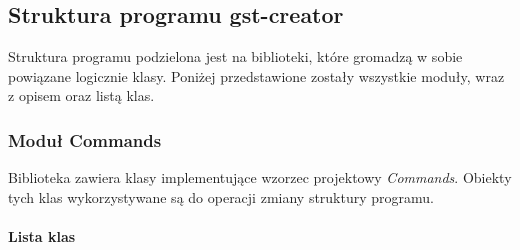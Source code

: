 \documentclass[12pt]{article}
\begin{document}
\subsection{Struktura programu gst-creator}
Struktura programu podzielona jest na biblioteki, które gromadzą w sobie powiązane logicznie klasy. Poniżej przedstawione zostały wszystkie moduły, wraz z opisem oraz listą klas.
\subsubsection{Moduł Commands}
Biblioteka zawiera klasy implementujące wzorzec projektowy \textit{Commands}. Obiekty tych klas wykorzystywane są do operacji zmiany struktury programu.
\paragraph{}
\textbf{Lista klas}
\vspace{-2mm}
\end{document}
